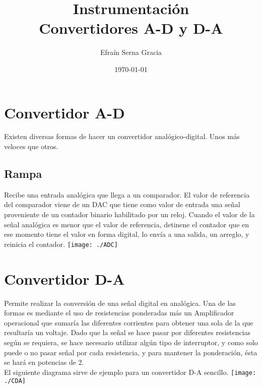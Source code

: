 \documentclass[12pt,spanish,lettersize,twocolumn]{article}
\title{%
\color{Maroon}Instrumentaci\'on\\
       \large Convertidores A-D y D-A\\
}
\author{Efra\'in Serna Gracia}
\date{\color{gray}\today}
\begin{document}
\maketitle
\section{Convertidor A-D}
Existen diversas formas de hacer un convertidor anal\'ogico-digital. Unos m\'as veloces que otros.\\
\subsection{Rampa}
Recibe una entrada anal\'ogica que llega a un comparador. El valor de referencia del comparador viene de un DAC que tiene como valor de entrada una se\~nal proveniente de un contador binario habilitado por un reloj. Cuando el valor de la se\~nal anal\'ogica es menor que el valor de referencia, detinene el contador que en ese momento tiene el valor en forma digital, lo env\'ia a una salida, un arreglo, y reinicia el contador. 
\texttt{[image: ./ADC]}
\section{Convertidor D-A}
Permite realizar la conversi\'on de una se\~nal digital en anal\'ogica. Una de las formas es mediante el uso de resistencias ponderadas m\'as un Amplificador operacional que sumar\'ia las diferentes corrientes para obtener una sola de la que resultar\'ia un voltaje. Dado que la se\~nal se hace pasar por diferentes resistencias seg\'un se requiera, se hace necesario utilizar alg\'un tipo de interruptor, y como solo puede o no pasar se\~nal por cada resistencia, y para mantener la ponderaci\'on, \'esta se har\'a en  potencias de 2.\\
El siguiente diagrama sirve de ejemplo para un convertidor D-A sencillo.
\texttt{[image: ./CDA]}
\end{document}
